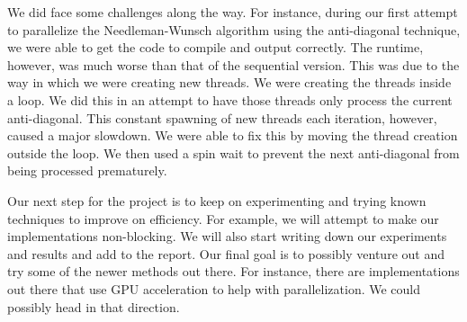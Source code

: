 \documentclass[conference]{IEEEtran}
\begin{document}
We did face some challenges along the way. For instance, during our first attempt to parallelize the Needleman-Wunsch algorithm using the anti-diagonal technique, we were able to get the code to compile and output correctly. The runtime, however, was much worse than that of the sequential version. This was due to the way in which we were creating new threads. We were creating the threads inside a loop. We did this in an attempt to have those threads only process the current anti-diagonal. This constant spawning of new threads each iteration, however, caused a major slowdown. We were able to fix this by moving the thread creation outside the loop. We then used a spin wait to prevent the next anti-diagonal from being processed prematurely.
 
Our next step for the project is to keep on experimenting and trying known techniques to improve on efficiency. For example, we will attempt to make our implementations non-blocking. We will also start writing down our experiments and results and add to the report. Our final goal is to possibly venture out and try some of the newer methods out there. For instance, there are implementations out there that use GPU acceleration to help with parallelization. We could possibly head in that direction.



\end{document}
